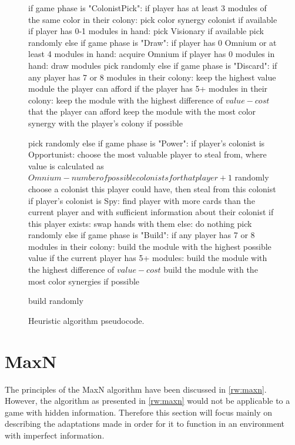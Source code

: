 \begin{figure}[ht]
\begin{code}[commandchars=\\\{\},codes={\catcode`\$=3\catcode`\^=7\catcode`\_=8}]
if game phase is "ColonistPick":
    if player has at least 3 modules of the same color in their colony:
        pick color synergy colonist if available
    if player has 0-1 modules in hand:
        pick Visionary if available
    pick randomly
else if game phase is "Draw":
    if player has 0 Omnium or at least 4 modules in hand:
        acquire Omnium
    if player has 0 modules in hand:
        draw modules
    pick randomly
else if game phase is "Discard":
    if any player has 7 or 8 modules in their colony:
        keep the highest value module the player can afford
    if the player has 5+ modules in their colony:
        keep the module with the highest difference of $value - cost$
        that the player can afford
    keep the module with the most color synergy with the player's
    colony if possible

    pick randomly
else if game phase is "Power":
    if player's colonist is Opportunist:
        choose the most valuable player to steal from,
        where value is calculated as
        $Omnium - number of possible colonists for that player + 1$
        randomly choose a colonist this player could have,
        then steal from this colonist
    if player's colonist is Spy:
        find player with more cards than the current player
        and with sufficient information about their colonist
        if this player exists:
            swap hands with them
        else:
            do nothing
    pick randomly
else if game phase is "Build":
    if any player has 7 or 8 modules in their colony:
        build the module with the highest possible value
    if the current player has 5+ modules:
        build the module with the highest difference of $value - cost$
    build the module with the most color synergies if possible

    build randomly
\end{code}
\caption{Heuristic algorithm pseudocode.}\label{algo:heur}
\end{figure}

\clearpage
\section{MaxN}
\label{sec:algomaxn}

The principles of the MaxN algorithm have been discussed in \autoref{rw:maxn}. 
However, the algorithm as presented in \autoref{rw:maxn} would not be applicable
to a game with hidden information. Therefore
this section will focus mainly on describing the adaptations made in order for it
to function in an environment with imperfect information.

